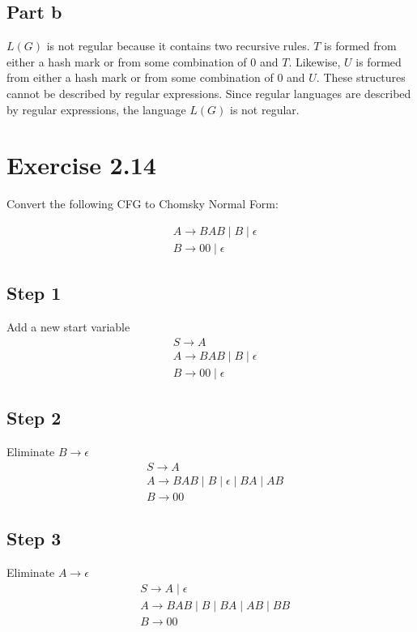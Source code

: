 \documentclass{article}
\begin{document}
\subsection{Part b}

$L(G)$ is not regular because it contains two recursive rules. $T$ is formed
from either a hash mark or from some combination of 0 and $T$. Likewise, $U$ is
formed from either a hash mark or from some combination of 0 and $U$. These
structures cannot be described by regular expressions. Since regular languages
are described by regular expressions, the language $L(G)$ is not regular.

\section{Exercise 2.14}

Convert the following CFG to Chomsky Normal Form:

\begin{align*}
	& A \rightarrow BAB \mid B \mid \epsilon\\
	& B \rightarrow 00 \mid \epsilon
\end{align*}

\subsection*{Step 1}
	Add a new start variable
	\begin{align*}
		& S \rightarrow A\\
		& A \rightarrow BAB \mid B \mid \epsilon\\
		& B \rightarrow 00 \mid \epsilon
	\end{align*}
\subsection*{Step 2}
	Eliminate $B \rightarrow \epsilon$
	\begin{align*}
		& S \rightarrow A\\
		& A \rightarrow BAB \mid B \mid \epsilon \mid BA \mid AB\\
		& B \rightarrow 00 
	\end{align*}
\subsection*{Step 3}
  Eliminate $A \rightarrow \epsilon$
	\begin{align*}
		& S \rightarrow A \mid \epsilon\\
		& A \rightarrow BAB \mid B \mid BA \mid AB \mid BB\\
		& B \rightarrow 00 
	\end{align*}
\end{document}
